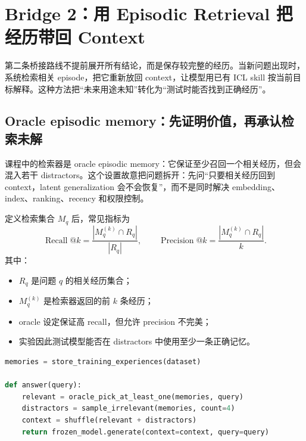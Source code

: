 \section{Bridge 2：用 Episodic Retrieval 把经历带回 Context}

第二条桥接路线不提前展开所有结论，而是保存较完整的经历。当新问题出现时，系统检索相关 episode，把它重新放回 context，让模型用已有 ICL skill 按当前目标解释。这种方法把“未来用途未知”转化为“测试时能否找到正确经历”。

\subsection{Oracle episodic memory：先证明价值，再承认检索未解}

课程中的检索器是 oracle episodic memory：它保证至少召回一个相关经历，但会混入若干 distractors。这个设置故意把问题拆开：先问“只要相关经历回到 context，latent generalization 会不会恢复”，而不是同时解决 embedding、index、ranking、recency 和权限控制。


定义检索集合 $M_q$ 后，常见指标为
$$
\operatorname{Recall}@k=\frac{|M_q^{(k)}\cap R_q|}{|R_q|},
\qquad
\operatorname{Precision}@k=\frac{|M_q^{(k)}\cap R_q|}{k}.
$$
其中：
\begin{itemize}
  \item $R_q$ 是问题 $q$ 的相关经历集合；
  \item $M_q^{(k)}$ 是检索器返回的前 $k$ 条经历；
  \item oracle 设定保证高 recall，但允许 precision 不完美；
  \item 实验因此测试模型能否在 distractors 中使用至少一条正确记忆。
\end{itemize}

\begin{lstlisting}[language=Python,caption={Oracle episodic retrieval 实验的职责分离}]
memories = store_training_experiences(dataset)

def answer(query):
    relevant = oracle_pick_at_least_one(memories, query)
    distractors = sample_irrelevant(memories, count=4)
    context = shuffle(relevant + distractors)
    return frozen_model.generate(context=context, query=query)
\end{lstlisting}


